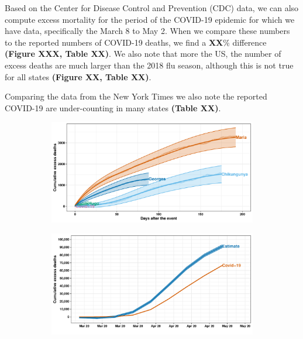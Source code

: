 \documentclass[11pt]{article}
\begin{document}
Based on the Center for Disease Control and Prevention (CDC) data, we can also compute excess mortality for the period of the COVID-19 epidemic for which we have data, specifically the March 8 to May 2. When we compare these numbers to the reported numbers of COVID-19 deaths, we find a \textbf{XX}\% difference \textbf{(Figure XXX, Table XX)}. We also note that more the US, the number of excess deaths are much larger than the 2018 flu season, although this is not true for all states \textbf{(Figure XX, Table XX)}.

Comparing the data from the New York Times \cite{smith2020coronavirus} we also note the reported COVID-19 are under-counting in many states \textbf{(Table XX)}.

\begin{figure}[ht]
	\centering
	\begin{subfigure}[t]{0.49\linewidth}
		\centering
		\includegraphics[width=1\linewidth]{figs/figure-2a.pdf} 
		\caption{} 
		\label{fig:excess-pr}
	\end{subfigure}
	\hfill
	\begin{subfigure}[t]{0.49\linewidth}
		\centering
		\includegraphics[width=1\linewidth]{figs/figure-2b.pdf}
		\caption{} 
		\label{fig:excess-usa}
	\end{subfigure}

\end{figure}
\end{document}
